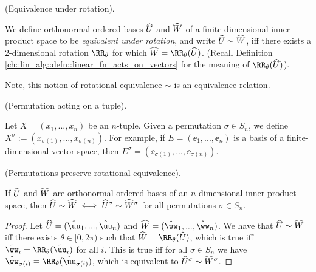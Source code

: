\begin{defn}
    (Equivalence under rotation).
    
    We define orthonormal ordered bases $\widehat{U}$ and $\widehat{W}$ of a finite-dimensional inner product space to be \textit{equivalent under rotation}, and write $\widehat{U} \sim \widehat{W}$, iff there exists a $2$-dimensional rotation $\RR_\theta$ for which $\hW = \RR_\theta(\hU)$. (Recall Definition \ref{ch::lin_alg::defn::linear_fn_acts_on_vectors} for the meaning of $\RR_\theta(\hU)$).
    
    Note, this notion of rotational equivalence $\sim$ is an equivalence relation.
\end{defn}

\begin{defn}
    (Permutation acting on a tuple). 
    
    Let $X = (x_1, ..., x_n)$ be an $n$-tuple. Given a permutation $\sigma \in S_n$, we define $X^\sigma := (x_{\sigma(1)}, ..., x_{\sigma(n)})$. For example, if $E = (\ee_1, ..., \ee_n)$ is a basis of a finite-dimensional vector space, then $E^\sigma = (\ee_{\sigma(1)}, ..., \ee_{\sigma(n)})$.
\end{defn}

\begin{theorem}
    \label{ch::lin_alg::thm::permutations_preserve_rotational_equivalence}

    (Permutations preserve rotational equivalence).
    
    If $\widehat{U}$ and $\widehat{W}$ are orthonormal ordered bases of an $n$-dimensional inner product space, then ${\widehat{U} \sim \widehat{W} \iff \widehat{U}^\sigma \sim \widehat{W}^\sigma}$ for all permutations $\sigma \in S_n$.
\end{theorem}

\begin{proof}
    Let $\hU = (\huu_1, ..., \huu_n)$ and $\hW = (\hww_1, ..., \hww_n)$. We have that $\widehat{U} \sim \widehat{W}$ iff there exists $\theta \in [0, 2\pi)$ such that $\hW = \RR_\theta(\hU)$, which is true iff $\hww_i = \RR_\theta(\huu_i)$ for all $i$. This is true iff for all $\sigma \in S_n$ we have $\hww_{\sigma(i)} = \RR_\theta(\huu_{\sigma(i)})$, which is equivalent to $\widehat{U}^\sigma \sim \widehat{W}^\sigma$.
\end{proof}

